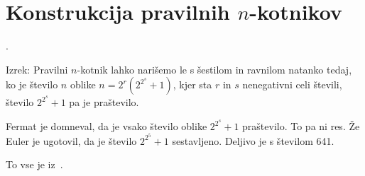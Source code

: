 \section{Konstrukcija pravilnih $n$-kotnikov}.

Izrek: Pravilni $n$-kotnik lahko narišemo le s šestilom in ravnilom natanko tedaj, ko je število $n$ oblike $ n = 2^r(2^{2^s} + 1) $, kjer sta $r$ in $s$ nenegativni celi števili, število $2^{2^s} + 1$ pa je praštevilo.

Fermat je domneval, da je vsako število oblike $2^{2^s} + 1$ praštevilo. To pa ni res. Že Euler je ugotovil, da je število $2^{2^5} + 1$ sestavljeno. Deljivo je s številom 641.

To vse je iz~\cite[str.\ 78]{jerman1998}.